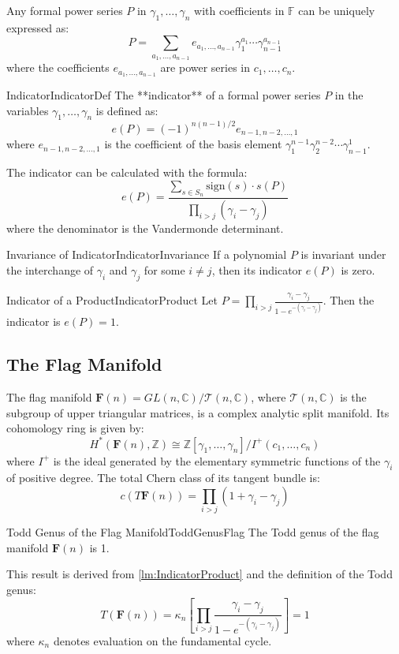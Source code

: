\documentclass{book}
\begin{document}
Any formal power series $P$ in $\gamma_1, \dots, \gamma_n$ with coefficients in $\mathbb{F}$ can be uniquely expressed as:
\[
P = \sum_{a_1, \dots, a_{n-1}} e_{a_1, \dots, a_{n-1}} \gamma_1^{a_1} \cdots \gamma_{n-1}^{a_{n-1}}
\]
where the coefficients $e_{a_1, \dots, a_{n-1}}$ are power series in $c_1, \dots, c_n$.

\begin{defn}{Indicator}{IndicatorDef}
The **indicator** of a formal power series $P$ in the variables $\gamma_1, \dots, \gamma_n$ is defined as:
\[
e(P) = (-1)^{n(n-1)/2} e_{n-1, n-2, \dots, 1}
\]
where $e_{n-1, n-2, \dots, 1}$ is the coefficient of the basis element $\gamma_1^{n-1}\gamma_2^{n-2}\cdots\gamma_{n-1}^1$.
\end{defn}

The indicator can be calculated with the formula:
\[
e(P) = \frac{\sum_{s \in S_n} \text{sign}(s) \cdot s(P)}{\prod_{i>j} (\gamma_i - \gamma_j)}
\]
where the denominator is the Vandermonde determinant.

\begin{lem}{Invariance of Indicator}{IndicatorInvariance}
If a polynomial $P$ is invariant under the interchange of $\gamma_i$ and $\gamma_j$ for some $i \neq j$, then its indicator $e(P)$ is zero.
\end{lem}

\begin{lem}{Indicator of a Product}{IndicatorProduct}
Let $P = \prod_{i>j} \frac{\gamma_i - \gamma_j}{1 - e^{-(\gamma_i - \gamma_j)}}$. Then the indicator is $e(P) = 1$.
\end{lem}

\subsection{The Flag Manifold} \label{sec:FlagManifold}

The flag manifold $\mathbf{F}(n) = GL(n, \mathbb{C}) / \mathcal{T}(n, \mathbb{C})$, where $\mathcal{T}(n, \mathbb{C})$ is the subgroup of upper triangular matrices, is a complex analytic split manifold. Its cohomology ring is given by:
\[
H^*(\mathbf{F}(n), \mathbb{Z}) \cong \mathbb{Z}[\gamma_1, \dots, \gamma_n] / I^+(c_1, \dots, c_n)
\]
where $I^+$ is the ideal generated by the elementary symmetric functions of the $\gamma_i$ of positive degree. The total Chern class of its tangent bundle is:
\[
c(T\mathbf{F}(n)) = \prod_{i>j} (1 + \gamma_i - \gamma_j)
\]

\begin{thm}{Todd Genus of the Flag Manifold}{ToddGenusFlag}
The Todd genus of the flag manifold $\mathbf{F}(n)$ is 1.
\end{thm}
\begin{Proof}
This result is derived from \cref{lm:IndicatorProduct} and the definition of the Todd genus:
\[
T(\mathbf{F}(n)) = \kappa_n \left[ \prod_{i>j} \frac{\gamma_i - \gamma_j}{1 - e^{-(\gamma_i - \gamma_j)}} \right] = 1
\]
where $\kappa_n$ denotes evaluation on the fundamental cycle.
\end{Proof}
\end{document}
